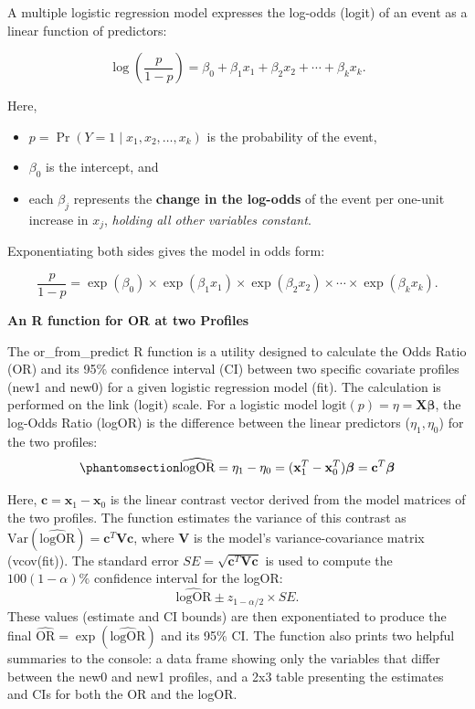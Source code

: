 \documentclass[
  letterpaper,
  DIV=11,
  numbers=noendperiod]{scrreprt}
\providecommand{\tightlist}{%
  \setlength{\itemsep}{0pt}\setlength{\parskip}{0pt}}\usepackage{longtable,booktabs,array}
\begin{document}
A multiple logistic regression model expresses the log-odds (logit) of
an event as a linear function of predictors:

\[
\log\left(\frac{p}{1-p}\right)
= \beta_0 + \beta_1 x_1 + \beta_2 x_2 + \cdots + \beta_k x_k.
\]

Here,

\begin{itemize}
\tightlist
\item
  \(p = \Pr(Y = 1 \mid x_1, x_2, \ldots, x_k)\) is the probability of
  the event,
\item
  \(\beta_0\) is the intercept, and
\item
  each \(\beta_j\) represents the \textbf{change in the log-odds} of the
  event per one-unit increase in \(x_j\), \emph{holding all other
  variables constant}.
\end{itemize}

Exponentiating both sides gives the model in odds form:

\[
\frac{p}{1-p}
= \exp(\beta_0)
\times \exp(\beta_1 x_1)
\times \exp(\beta_2 x_2)
\times \cdots
\times \exp(\beta_k x_k).
\]

\textbf{An R function for OR at two Profiles}

The or\_from\_predict R function is a utility designed to calculate the
Odds Ratio (OR) and its 95\% confidence interval (CI) between two
specific covariate profiles (new1 and new0) for a given logistic
regression model (fit). The calculation is performed on the link (logit)
scale. For a logistic model
\(\text{logit}(p) = \eta = \mathbf{X}\boldsymbol{\beta}\), the log-Odds
Ratio (logOR) is the difference between the linear predictors
(\(\eta_1, \eta_0\)) for the two profiles:
\begin{equation}\phantomsection\label{eq-logor}{\widehat{\text{logOR}} = \eta_1 - \eta_0 = (\mathbf{x}_1^T - \mathbf{x}_0^T) \boldsymbol{\beta} = \mathbf{c}^T \boldsymbol{\beta}}\end{equation}

Here, \(\mathbf{c} = \mathbf{x}_1 - \mathbf{x}_0\) is the linear
contrast vector derived from the model matrices of the two profiles. The
function estimates the variance of this contrast as
\(\text{Var}(\widehat{\text{logOR}}) = \mathbf{c}^T \mathbf{V} \mathbf{c}\),
where \(\mathbf{V}\) is the model's variance-covariance matrix
(vcov(fit)). The standard error
\(SE = \sqrt{\mathbf{c}^T \mathbf{V} \mathbf{c}}\) is used to compute
the \(100(1-\alpha)\%\) confidence interval for the logOR:
\[\widehat{\text{logOR}} \pm z_{1-\alpha/2} \times SE.\] These values
(estimate and CI bounds) are then exponentiated to produce the final
\(\widehat{\text{OR}} = \exp(\widehat{\text{logOR}})\) and its 95\% CI.
The function also prints two helpful summaries to the console: a data
frame showing only the variables that differ between the new0 and new1
profiles, and a 2x3 table presenting the estimates and CIs for both the
OR and the logOR.
\end{document}
